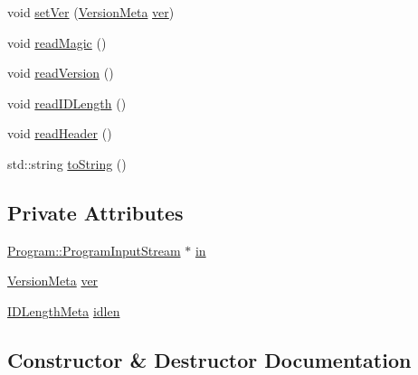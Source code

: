 \begin{DoxyCompactItemize}
\item 
void \mbox{\hyperlink{class_erable_1_1_erable_1_1_meta_1_1_metadata_a47af14fa80a14f0b686c7756a7aae1d8}{set\+Ver}} (\mbox{\hyperlink{struct_erable_1_1_erable_1_1_meta_1_1_version_meta}{Version\+Meta}} \mbox{\hyperlink{class_erable_1_1_erable_1_1_meta_1_1_metadata_adbf922c4cac970605f38dae0c10c3f2e}{ver}})
\item 
void \mbox{\hyperlink{class_erable_1_1_erable_1_1_meta_1_1_metadata_ace16c8ff5513d81b9b8043a3f1b9f702}{read\+Magic}} ()
\item 
void \mbox{\hyperlink{class_erable_1_1_erable_1_1_meta_1_1_metadata_ac19f9f011d4a3c1e3131d50e38d6bfa2}{read\+Version}} ()
\item 
void \mbox{\hyperlink{class_erable_1_1_erable_1_1_meta_1_1_metadata_a52b180ed2b85d929e30b05a0430fc109}{read\+I\+D\+Length}} ()
\item 
void \mbox{\hyperlink{class_erable_1_1_erable_1_1_meta_1_1_metadata_a34fd970b8f73e00e73af70bffc9c6d8a}{read\+Header}} ()
\item 
std\+::string \mbox{\hyperlink{class_erable_1_1_erable_1_1_meta_1_1_metadata_a49cc957a93e5ee40b2781fa2691de6d1}{to\+String}} ()
\end{DoxyCompactItemize}
\subsection*{Private Attributes}
\begin{DoxyCompactItemize}
\item 
\mbox{\hyperlink{class_erable_1_1_erable_1_1_program_1_1_program_input_stream}{Program\+::\+Program\+Input\+Stream}} $\ast$ \mbox{\hyperlink{class_erable_1_1_erable_1_1_meta_1_1_metadata_a8b9de1048f3739f22de3e00644ef5931}{in}}
\item 
\mbox{\hyperlink{struct_erable_1_1_erable_1_1_meta_1_1_version_meta}{Version\+Meta}} \mbox{\hyperlink{class_erable_1_1_erable_1_1_meta_1_1_metadata_adbf922c4cac970605f38dae0c10c3f2e}{ver}}
\item 
\mbox{\hyperlink{struct_erable_1_1_erable_1_1_meta_1_1_i_d_length_meta}{I\+D\+Length\+Meta}} \mbox{\hyperlink{class_erable_1_1_erable_1_1_meta_1_1_metadata_a4cbb333222343f1b01dfff65b5a91b4c}{idlen}}
\end{DoxyCompactItemize}


\subsection{Constructor \& Destructor Documentation}
\mbox{\label{class_erable_1_1_erable_1_1_meta_1_1_metadata_a08912a3da1b16a012a8dcbd1cb87eebb}} 

